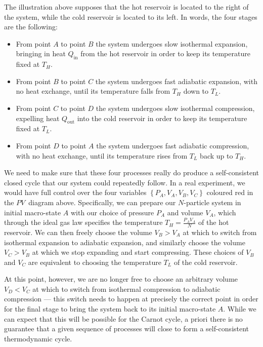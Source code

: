 The illustration above supposes that the hot reservoir is located to the right of the system, while the cold reservoir is located to its left.
In words, the four stages are the following: \\[-24 pt]
\begin{itemize}
  \item From point $A$ to point $B$ the system undergoes slow isothermal expansion, bringing in heat $Q_{\text{in}}$ from the hot reservoir in order to keep its temperature fixed at $T_H$.
  \item From point $B$ to point $C$ the system undergoes fast adiabatic expansion, with no heat exchange, until its temperature falls from $T_H$ down to $T_L$.
  \item From point $C$ to point $D$ the system undergoes slow isothermal compression, expelling heat $Q_{\text{out}}$ into the cold reservoir in order to keep its temperature fixed at $T_L$.
  \item From point $D$ to point $A$ the system undergoes fast adiabatic compression, with no heat exchange, until its temperature rises from $T_L$ back up to $T_H$.
\end{itemize}

We need to make sure that these four processes really do produce a self-consistent closed cycle that our system could repeatedly follow.
In a real experiment, we would have full control over the four variables $\left\{P_A, V_A, V_B, V_C\right\}$ coloured red in the $PV$~diagram above.
Specifically, we can prepare our $N$-particle system in initial macro-state $A$ with our choice of pressure $P_A$ and volume $V_A$, which through the ideal gas law specifies the temperature $T_H = \frac{P_A V_A}{N}$ of the hot reservoir.
We can then freely choose the volume $V_B > V_A$ at which to switch from isothermal expansion to adiabatic expansion, and similarly choose the volume $V_C > V_B$ at which we stop expanding and start compressing.
These choices of $V_B$ and $V_C$ are equivalent to choosing the temperature $T_L$ of the cold reservoir. %

At this point, however, we are no longer free to choose an arbitrary volume $V_D < V_C$ at which to switch from isothermal compression to adiabatic compression --- this switch needs to happen at precisely the correct point in order for the final stage to bring the system back to its initial macro-state $A$.
While we can expect that this will be possible for the Carnot cycle, a priori there is no guarantee that a given sequence of processes will close to form a self-consistent thermodynamic cycle.

